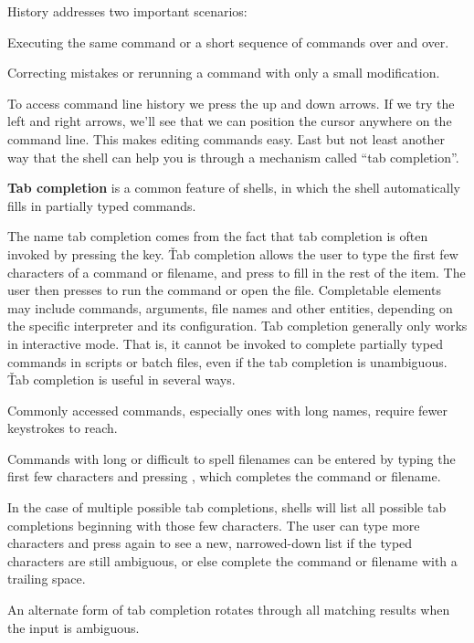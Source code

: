 History addresses two important scenarios:
\bit
\item Executing the same command or a short sequence of commands over and over.
\item Correcting mistakes or rerunning a command with only a small modification.
\eit

To access command line history we press the up and down arrows. If we try the left and right arrows, we'll see that we
can position the cursor anywhere on the command line. This makes editing commands easy. \v

Last but not least another way that the shell can help you is through a mechanism called ``tab completion''.

\textbf{Tab completion} is a common feature of shells, in which the shell automatically fills in partially typed
commands.
\ed

The name tab completion comes from the fact that tab completion is often invoked by pressing the  key. \v

Tab completion allows the user to type the first few characters of a command or filename, and press  to
fill in the rest of the item. The user then presses  to run the command or open the file. Completable
elements may include commands, arguments, file names and other entities, depending on the specific interpreter and
its configuration. Tab completion generally only works in interactive mode. That is, it cannot be invoked to complete
partially typed commands in scripts or batch files, even if the tab completion is unambiguous. \v

Tab completion is useful in several ways.
\bit
\item Commonly accessed commands, especially ones with long names, require fewer keystrokes to reach.
\item Commands with long or difficult to spell filenames can be entered by typing the first few characters and pressing
, which completes the command or filename.
\item In the case of multiple possible tab completions, shells will list all possible tab completions beginning with
those few characters. The user can type more characters and press  again to see a new, narrowed-down list if
the typed characters are still ambiguous, or else complete the command or filename with a trailing space.
\item An alternate form of tab completion rotates through all matching results when the input is ambiguous.
\eit

